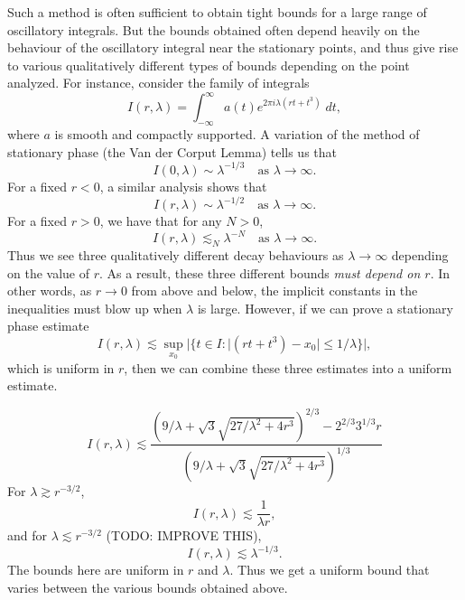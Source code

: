 	Such a method is often sufficient to obtain tight bounds for a large range of oscillatory integrals. But the bounds obtained often depend heavily on the behaviour of the oscillatory integral near the stationary points, and thus give rise to various qualitatively different types of bounds depending on the point analyzed. For instance, consider the family of integrals
	\[ I(r,\lambda) = \int_{-\infty}^\infty a(t) e^{2 \pi i \lambda (rt + t^3)}\; dt, \]
	where $a$ is smooth and compactly supported. A variation of the method of stationary phase (the Van der Corput Lemma) tells us that
	\[ I(0,\lambda) \sim \lambda^{-1/3} \quad\text{as $\lambda \to \infty$}. \]
	For a fixed $r < 0$, a similar analysis shows that
	\[ I(r,\lambda) \sim \lambda^{-1/2} \quad\text{as $\lambda \to \infty$}. \]
	For a fixed $r > 0$, we have that for any $N > 0$,
	\[ I(r,\lambda) \lesssim_N \lambda^{-N} \quad\text{as $\lambda \to \infty$}. \]
	Thus we see three qualitatively different decay behaviours as $\lambda \to \infty$ depending on the value of $r$. As a result, these three different bounds \emph{must depend on $r$}. In other words, as $r \to 0$ from above and below, the implicit constants in the inequalities must blow up when $\lambda$ is large. However, if we can prove a stationary phase estimate
	\[ I(r,\lambda) \lesssim \sup_{x_0} |\{ t \in I : |(rt + t^3) - x_0| \leq 1/\lambda \}|, \]
	which is uniform in $r$, then we can combine these three estimates into a uniform estimate. 

	\[ I(r,\lambda) \lesssim \frac{(9 / \lambda + \sqrt{3} \sqrt{27/\lambda^2 + 4r^3})^{2/3} - 2^{2/3} 3^{1/3} r}{(9/\lambda + \sqrt{3} \sqrt{27/\lambda^2 + 4r^3})^{1/3}} \]
	For $\lambda \gtrsim r^{-3/2}$,
	\[ I(r,\lambda) \lesssim \frac{1}{\lambda r}, \]
	and for $\lambda \lesssim r^{-3/2}$ (TODO: IMPROVE THIS),
	\[ I(r,\lambda) \lesssim \lambda^{-1/3}. \]
	The bounds here are uniform in $r$ and $\lambda$. Thus we get a uniform bound that varies between the various bounds obtained above.




